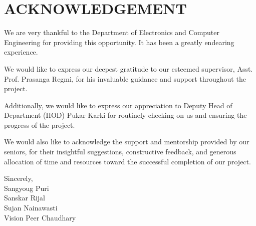 \chapter*{ACKNOWLEDGEMENT} 

We are very thankful to the Department of Electronics and Computer Engineering for providing this opportunity. It has been a greatly endearing experience.

We would like to express our deepest gratitude to our esteemed supervisor, Asst. Prof. Prasanga Regmi, for his invaluable guidance and support throughout the project.

Additionally, we would like to express our appreciation to Deputy Head of Department (HOD) Pukar Karki for routinely checking on us and ensuring the progress of the project.

We would also like to acknowledge the support and mentorship provided by our seniors, for their insightful suggestions, constructive feedback, and generous allocation of time and resources toward the successful completion of our project.

\vspace{1cm} Sincerely,\\ Sangyoug Puri\\ Sanskar Rijal\\ Sujan Nainawasti\\ Vision Peer Chaudhary
